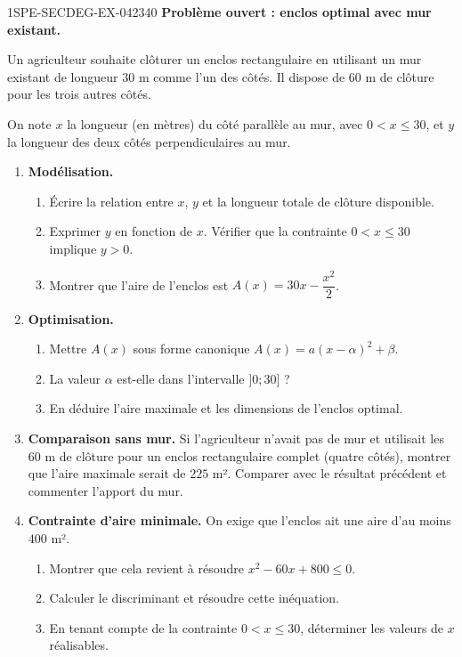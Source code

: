 \begin{exercice}{1SPE-SECDEG-EX-042}{3}{40}
\textbf{Problème ouvert : enclos optimal avec mur existant.}

Un agriculteur souhaite clôturer un enclos rectangulaire en utilisant un mur existant de longueur $30$ m comme l'un des côtés. Il dispose de $60$ m de clôture pour les trois autres côtés.

On note $x$ la longueur (en mètres) du côté parallèle au mur, avec $0 < x \leq 30$, et $y$ la longueur des deux côtés perpendiculaires au mur.

\begin{enumerate}
  \item \textbf{Modélisation.}
  \begin{enumerate}
    \item Écrire la relation entre $x$, $y$ et la longueur totale de clôture disponible.
    \item Exprimer $y$ en fonction de $x$. Vérifier que la contrainte $0 < x \leq 30$ implique $y > 0$.
    \item Montrer que l'aire de l'enclos est $A(x) = 30x - \dfrac{x^2}{2}$.
  \end{enumerate}

  \item \textbf{Optimisation.}
  \begin{enumerate}
    \item Mettre $A(x)$ sous forme canonique $A(x) = a(x - \alpha)^2 + \beta$.
    \item La valeur $\alpha$ est-elle dans l'intervalle $]0 ; 30]$ ?
    \item En déduire l'aire maximale et les dimensions de l'enclos optimal.
  \end{enumerate}

  \item \textbf{Comparaison sans mur.} Si l'agriculteur n'avait pas de mur et utilisait les $60$ m de clôture pour un enclos rectangulaire complet (quatre côtés), montrer que l'aire maximale serait de $225$ m². Comparer avec le résultat précédent et commenter l'apport du mur.

  \item \textbf{Contrainte d'aire minimale.} On exige que l'enclos ait une aire d'au moins $400$ m².
  \begin{enumerate}
    \item Montrer que cela revient à résoudre $x^2 - 60x + 800 \leq 0$.
    \item Calculer le discriminant et résoudre cette inéquation.
    \item En tenant compte de la contrainte $0 < x \leq 30$, déterminer les valeurs de $x$ réalisables.
  \end{enumerate}


\end{enumerate}
\end{exercice}
